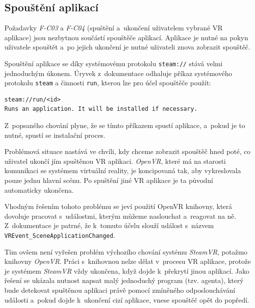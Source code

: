 \subsection{Spouštění
aplikací}\label{spouux161tux11bnuxed-aplikacuxed}

Požadavky \emph{F-C03} a \emph{F-C04} (spuštění a~ukončení uživatelem
vybrané VR aplikace) jsou nezbytnou součástí spouštěče
aplikací. Aplikace je nutné na pokyn uživatele spouštět a~po jejich ukončení 
je nutné uživateli znova zobrazit spouštěč.

Spouštění aplikace se díky systémovému protokolu \texttt{steam://} stává
velmi jednoduchým úkonem. Úryvek z~dokumentace \autocite{protocoldocs} odhaluje příkaz
systémového protokolu \texttt{steam} a činnosti \texttt{run}, kterou lze
pro účel spouštěče použít:

\begin{verbatim}
steam://run/<id>
Runs an application. It will be installed if necessary.
\end{verbatim}

Z~popsaného chování plyne, že se tímto příkazem spustí aplikace, a~pokud je
to nutné, spustí se instalační proces. 

Problémová situace nastává ve
chvíli, kdy chceme zobrazit spouštěč hned poté, co uživatel
ukončí jím spuštěnou VR aplikaci. \emph{OpenVR}, které má na starosti
komunikaci se systémem virtuální reality, je koncipovaná tak, 
aby vykreslovala pouze jednu hlavní scénu. Po spuštění jiné VR aplikace 
je ta původní automaticky ukončena.

Vhodným řešením tohoto problému se jeví použití OpenVR knihovny, která
dovoluje pracovat s~událostmi, kterým můžeme naslouchat a~reagovat na
ně. Z~dokumentace \autocite{openvrdocs} je patrné, že k~tomuto účelu slouží událost s~názvem
\texttt{VREvent\_SceneApplicationChanged}. 

Tím ovšem není vyřešen
problém výchozího chování systému \emph{SteamVR}, potažmo knihovny
\emph{OpenVR}. Práci s~knihovnou nelze dělat v~procesu VR aplikace,
protože je systémem \emph{SteamVR} vždy ukončena, když dojde
k~překrytí jinou aplikací. Jako řešení se ukázala nutnost napsat malý 
jednoduchý program (tzv. agenta), který bude detekovat spuštěnou aplikaci právě
pomocí zmíněného odposlouchávání události a~pokud dojde k~ukončení cizí 
aplikace, vnese spouštěč opět do popředí.

